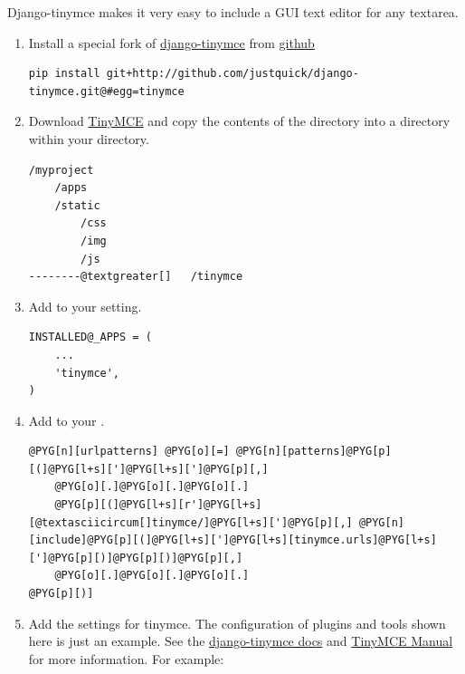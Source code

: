 \documentclass[letterpaper,10pt,english]{manual}
\begin{document}
Django-tinymce makes it very easy to include a GUI text editor for any textarea.
\begin{enumerate}
\item {} 
Install a special fork of \href{http://code.google.com/p/django-tinymce/}{django-tinymce}  from \href{http://github.com/justquick/django-tinymce}{github}

\begin{Verbatim}[commandchars=@\[\]]
pip install git+http://github.com/justquick/django-tinymce.git@#egg=tinymce
\end{Verbatim}

\item {} 
Download \href{http://tinymce.moxiecode.com/download.php}{TinyMCE} and copy the contents of the  directory into a  directory within your  directory.

\begin{Verbatim}[commandchars=@\[\]]
/myproject
    /apps
    /static
        /css
        /img
        /js
--------@textgreater[]   /tinymce
\end{Verbatim}

\item {} 
Add  to your  setting.

\begin{Verbatim}[commandchars=@\[\]]
INSTALLED@_APPS = (
    ...
    'tinymce',
)
\end{Verbatim}

\item {} 
Add  to your .

\begin{Verbatim}[commandchars=@\[\]]
@PYG[n][urlpatterns] @PYG[o][=] @PYG[n][patterns]@PYG[p][(]@PYG[l+s][']@PYG[l+s][']@PYG[p][,]
    @PYG[o][.]@PYG[o][.]@PYG[o][.]
    @PYG[p][(]@PYG[l+s][r']@PYG[l+s][@textasciicircum[]tinymce/]@PYG[l+s][']@PYG[p][,] @PYG[n][include]@PYG[p][(]@PYG[l+s][']@PYG[l+s][tinymce.urls]@PYG[l+s][']@PYG[p][)]@PYG[p][)]@PYG[p][,]
    @PYG[o][.]@PYG[o][.]@PYG[o][.]
@PYG[p][)]
\end{Verbatim}

\item {} 
Add the settings for tinymce. The configuration of plugins and tools shown here is just an example. See the \href{http://github.com/justquick/django-tinymce/blob/master/docs/installation.rst}{django-tinymce docs} and \href{http://wiki.moxiecode.com/index.php/TinyMCE:Configuration}{TinyMCE Manual} for more information. For example:


\end{enumerate}
\end{document}
